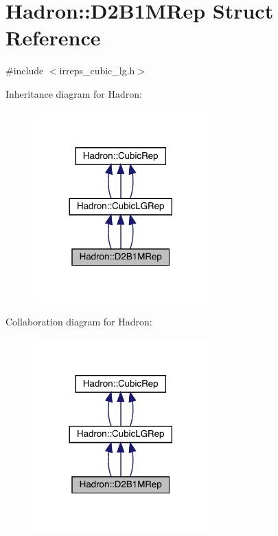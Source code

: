\hypertarget{structHadron_1_1D2B1MRep}{}\section{Hadron\+:\+:D2\+B1\+M\+Rep Struct Reference}
\label{structHadron_1_1D2B1MRep}


{\ttfamily \#include $<$irreps\+\_\+cubic\+\_\+lg.\+h$>$}



Inheritance diagram for Hadron\+:
\nopagebreak
\begin{figure}[H]
\begin{center}
\leavevmode
\includegraphics[width=192pt]{dc/d90/structHadron_1_1D2B1MRep__inherit__graph}
\end{center}
\end{figure}


Collaboration diagram for Hadron\+:
\nopagebreak
\begin{figure}[H]
\begin{center}
\leavevmode
\includegraphics[width=192pt]{d9/def/structHadron_1_1D2B1MRep__coll__graph}
\end{center}
\end{figure}
